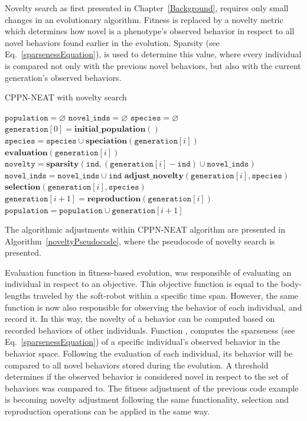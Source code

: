 Novelty search as first presented in Chapter~\ref{Background}, requires only small changes in an evolutionary algorithm. Fitness is replaced by a novelty metric which determines how novel is a phenotype's observed behavior in respect to all novel behaviors found earlier in the evolution. Sparsity (see Eq.~\ref{sparsenessEquation}), is used to determine this value, where every individual is compared not only with the previous novel behaviors, but also with the current generation's observed behaviors.



\begin{algorithm}[t!]
\caption{CPPN-NEAT with novelty search}
\label{noveltyPseudocode}
\begin{algorithmic}[1]
\STATE $\mathtt{population} = \varnothing$
\STATE $\mathtt{novel\_inds} = \varnothing$
\STATE $\mathtt{species} = \varnothing$
\STATE $\mathtt{generation}[0] = \mathbf{initial\_population}()$
\STATE $\mathtt{species} = \mathtt{species} \cup \mathbf{speciation}(\mathtt{generation}[i])$
\STATE $\mathbf{evaluation}(\mathtt{generation}[i])$
\STATE $\mathtt{novelty} = \mathbf{sparsity}(\mathtt{ind}, (\mathtt{generation}[i] - \mathtt{ind}) \cup \mathtt{novel\_inds})$
\STATE $\mathtt{novel\_inds} = \mathtt{novel\_inds} \cup \mathtt{ind}$
\ENDIF
\ENDFOR
\STATE $\mathbf{adjust\_novelty}(\mathtt{generation}[i], \mathtt{species})$
\STATE $\mathbf{selection}(\mathtt{generation}[i], \mathtt{species})$
\STATE $\mathtt{generation}[i+1] = \mathbf{reproduction}(\mathtt{generation}[i])$
\STATE $\mathtt{population} = \mathtt{population} \cup \mathtt{generation}[i+1]$
\ENDFOR
\end{algorithmic}
\end{algorithm}


The algorithmic adjustments within CPPN-NEAT algorithm are presented in Algorithm~\ref{noveltyPseudocode}, where the pseudocode of novelty search is presented.

Evaluation function in fitness-based evolution, was responsible of evaluating an individual in respect to an objective. This objective function is equal to the body-lengths traveled by the soft-robot within a specific time span. However, the same function is now also responsible for observing the behavior of each individual, and record it. In this way, the novelty of a behavior can be computed based on recorded behaviors of other individuals. Function , computes the sparseness (see Eq.~\ref{sparsenessEquation}) of a specific individual's observed behavior in the behavior space. Following the evaluation of each individual, its behavior will be compared to all novel behaviors stored during the evolution. A threshold determines if the observed behavior is considered novel in respect to the set of behaviors was compared to. The fitness adjustment of the previous code example is becoming novelty adjustment following the same functionality, selection and reproduction operations can be applied in the same way.


